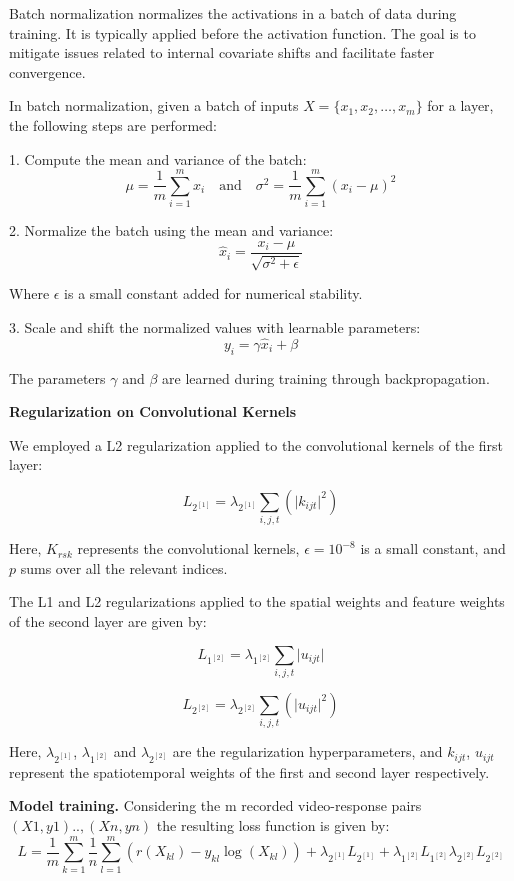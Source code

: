 Batch normalization normalizes the activations in a batch of data
during training. It is typically applied before the activation function.
The goal is to mitigate issues related to internal covariate
shifts and facilitate faster convergence.

In batch normalization, given a batch of inputs $X = \{x_1, x_2, \ldots,
    x_m\}$ for a layer, the following steps are performed:

1. Compute the mean and variance of the batch:
\[
    \mu = \frac{1}{m} \sum_{i=1}^{m} x_i \quad \text{and} \quad \sigma^2 =
    \frac{1}{m} \sum_{i=1}^{m} (x_i - \mu)^2
\]

2. Normalize the batch using the mean and variance:
\[
    \hat{x}_i = \frac{x_i - \mu}{\sqrt{\sigma^2 + \epsilon}}
\]

Where $\epsilon$ is a small constant added for numerical stability.

3. Scale and shift the normalized values with learnable parameters:
\[
    y_i = \gamma \hat{x}_i + \beta
\]

The parameters $\gamma$ and $\beta$ are learned during training through
backpropagation.

\textbf{ Regularization on Convolutional Kernels}

We employed a L2 regularization applied to the convolutional kernels of the
first layer:

\[
    L_{2^{[1]}} = \lambda_{2^{[1]}} \sum_{i,j,t} (\lvert k_{ijt} \rvert^2)
\]

Here, $K_{rsk}$ represents the convolutional kernels, $\epsilon = 10^{-8}$ is a
small constant, and $p$ sums over all the relevant indices.

The L1 and L2 regularizations applied to the spatial weights and feature
weights of the second layer are given by:

\[
    L_{1^{[2]}} = \lambda_{1^{[2]}} \sum_{i,j,t} \lvert u_{ijt} \rvert
\]

\[
    L_{2^{[2]}} = \lambda_{2^{[2]}} \sum_{i,j,t} (\lvert u_{ijt} \rvert^2)
\]

Here, $\lambda_{2^{[1]}} $, $\lambda_{1^{[2]}}$ and $\lambda_{2^{[2]}}$ are the
regularization hyperparameters,
and $k_{ijt}$, $u_{ijt}$ represent the spatiotemporal weights of the first and
second layer respectively.

\textbf{Model training.}
Considering the m recorded video-response pairs $(X1, y1).., (Xn,yn)$ the
resulting loss function is given by:
\[
    L= \frac{1}{m} \sum_{k=1}^{m} \frac{1}{n} \sum_{l=1}^{m} (r(X_{kl}) -
    y_{kl}
    \log(X_{kl})) + \lambda_{2^{[1]}} L_{2^{[1]}} + \lambda_{1^{[2]}}
    L_{1^{[2]}}
    \lambda_{2^{[2]}} L_{2^{[2]}}
\]

